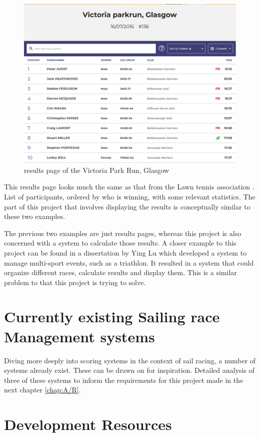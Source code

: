 \documentclass{l4proj}
\begin{document}
\begin{figure}[h!]
    \centering
    \includegraphics[width=0.6\linewidth]{images/ParkRun.png} 

    \caption{results page of the Victoria Park Run, Glasgow \citep{Parkrun}
    }

    \label{fig:parkrun} 
\end{figure}

This results page looks much the same as that from the Lawn tennis association \citet{Tennis}. List of participants, ordered by who is winning, with some relevant statistics. The part of this project that involves displaying the results is conceptually similar to these two examples.

The previous two examples are just results pages, whereas this project is also concerned with a system to calculate those results. A closer example to this project can be found in a dissertation by Ying Lu \citet{Multi-sport} which developed a system to manage multi-sport events, such as a triathlon. It resulted in a system that could organize different races, calculate results and display them. This is a similar problem to that this project is trying to solve.

\section{Currently existing Sailing race Management systems}
Diving more deeply into scoring systems in the context of sail racing, a number of systems already exist. These can be drawn on for inspiration. Detailed analysis of three of these systems to inform the requirements for this project made in the next chapter \autoref{chap:A/R}.

\section{Development Resources}
\end{document}
